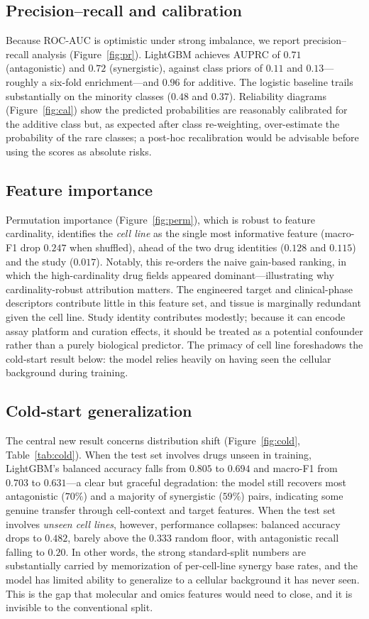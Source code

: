 \documentclass{bmcart}
\begin{document}
\subsection*{Precision--recall and calibration}
Because ROC-AUC is optimistic under strong imbalance, we report precision--recall analysis
(Figure~\ref{fig:pr}). LightGBM achieves AUPRC of $0.71$ (antagonistic) and $0.72$ (synergistic),
against class priors of $0.11$ and $0.13$---roughly a six-fold enrichment---and $0.96$ for additive.
The logistic baseline trails substantially on the minority classes ($0.48$ and $0.37$). Reliability
diagrams (Figure~\ref{fig:cal}) show the predicted probabilities are reasonably calibrated for the
additive class but, as expected after class re-weighting, over-estimate the probability of the rare
classes; a post-hoc recalibration would be advisable before using the scores as absolute risks.

\subsection*{Feature importance}
Permutation importance (Figure~\ref{fig:perm}), which is robust to feature cardinality, identifies the
\emph{cell line} as the single most informative feature (macro-F1 drop $0.247$ when shuffled), ahead
of the two drug identities ($0.128$ and $0.115$) and the study ($0.017$). Notably, this re-orders the
naive gain-based ranking, in which the high-cardinality drug fields appeared dominant---illustrating
why cardinality-robust attribution matters. The engineered target and clinical-phase descriptors
contribute little in this feature set, and tissue is marginally redundant given the cell line. Study
identity contributes modestly; because it can encode assay platform and curation effects, it should be
treated as a potential confounder rather than a purely biological predictor. The primacy of cell line
foreshadows the cold-start result below: the model relies heavily on having seen the cellular
background during training.

\subsection*{Cold-start generalization}
The central new result concerns distribution shift (Figure~\ref{fig:cold}, Table~\ref{tab:cold}). When
the test set involves drugs unseen in training, LightGBM's balanced accuracy falls from $0.805$ to
$0.694$ and macro-F1 from $0.703$ to $0.631$---a clear but graceful degradation: the model still
recovers most antagonistic ($70\%$) and a majority of synergistic ($59\%$) pairs, indicating some
genuine transfer through cell-context and target features. When the test set involves \emph{unseen
cell lines}, however, performance collapses: balanced accuracy drops to $0.482$, barely above the
$0.333$ random floor, with antagonistic recall falling to $0.20$. In other words, the strong
standard-split numbers are substantially carried by memorization of per-cell-line synergy base rates,
and the model has limited ability to generalize to a cellular background it has never seen. This is the
gap that molecular and omics features would need to close, and it is invisible to the conventional
split.
\end{document}
